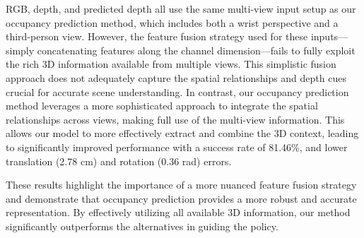 RGB, depth, and predicted depth all use the same multi-view input setup as our occupancy prediction method, which includes both a wrist perspective and a third-person view. However, the feature fusion strategy used for these inputs—simply concatenating features along the channel dimension—fails to fully exploit the rich 3D information available from multiple views. This simplistic fusion approach does not adequately capture the spatial relationships and depth cues crucial for accurate scene understanding. In contrast, our occupancy prediction method leverages a more sophisticated approach to integrate the spatial relationships across views, making full use of the multi-view information. This allows our model to more effectively extract and combine the 3D context, leading to significantly improved performance with a success rate of 81.46\%, and lower translation (2.78 cm) and rotation (0.36 rad) errors.

These results highlight the importance of a more nuanced feature fusion strategy and demonstrate that occupancy prediction provides a more robust and accurate representation. By effectively utilizing all available 3D information, our method significantly outperforms the alternatives in guiding the policy.


\begin{table}
\centering
{}
\caption{Success Rate in Real-word }
\label{tab:real_world}
\end{table}


